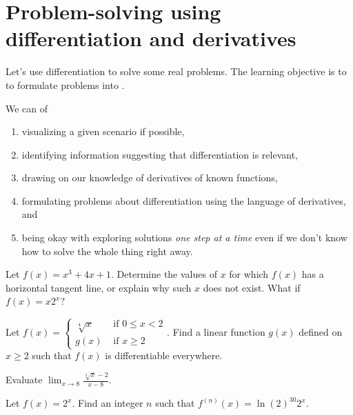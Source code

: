 \documentclass[../main.tex]{subfiles}
\begin{document}
 \section{Problem-solving using differentiation and derivatives}
Let's use differentiation to solve some real problems. The learning objective is to  to formulate problems into .

\label{page:diff-problem-solving}
We can  of
\begin{enumerate}
  \item visualizing a given scenario if possible,
  \item identifying information suggesting that differentiation is relevant,
  \item drawing on our knowledge of derivatives of known functions,
  \item formulating problems about differentiation using the language of derivatives, and
  \item being okay with exploring solutions \emph{one step at a time} even if we don't know how to solve the whole thing right away.
\end{enumerate}

\bigskip
\begin{example}
  Let \(f(x) = x^{3} + 4x + 1\).  Determine the values of \(x\) for which \(f(x)\) has a horizontal tangent line, or explain why such \(x\) does not exist. What if \(f(x) = x 2^{x}\)?

\end{example}
\vfill{}
\clearpage


\begin{example}
  Let \(f(x) = \begin{cases} \sqrt[4]{x} &\text{ if } 0 \le x < 2 \\ g(x) &\text{ if } x \ge 2 \end{cases}\). Find a linear function \(g(x)\) defined on \(x \ge 2\) such that \(f(x)\) is differentiable everywhere.

\end{example}


\begin{example}
  Evaluate \(\lim_{x \to 8} \frac{\sqrt[3]{x} - 2}{x - 8}\).

\end{example}
\clearpage

\begin{example}
  Let \(f(x) = 2^{x}\). Find an integer \(n\) such that \(f^{(n)}(x) = \ln(2)^{30} 2^{x}\).

\end{example}
\end{document}
